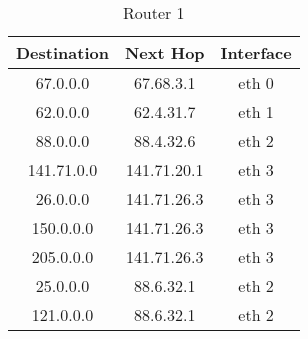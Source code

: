 \documentclass{WeSTassignment}
\begin{document}
\begin{table}[h]
\centering
\caption{Router 1}
\label{Router 1}
\begin{tabular}{ccc}
\hline
\multicolumn{1}{|c|}{\textbf{Destination}} & \multicolumn{1}{c|}{\textbf{Next Hop}} & \multicolumn{1}{c|}{\textbf{Interface}} \\ \hline
67.0.0.0                                   & 67.68.3.1                              & eth 0                                   \\
62.0.0.0                                   & 62.4.31.7                              & eth 1                                   \\
88.0.0.0                                   & 88.4.32.6                              & eth 2                                    \\
141.71.0.0                                 & 141.71.20.1                            & eth 3                                    \\
26.0.0.0                                   & 141.71.26.3                            & eth 3                                   \\
150.0.0.0                                  & 141.71.26.3                            & eth 3                                   \\
205.0.0.0                                  & 141.71.26.3                            & eth 3                                    \\
25.0.0.0                                   & 88.6.32.1                              & eth 2                                    \\
121.0.0.0                                  & 88.6.32.1                              & eth 2                                   
\end{tabular}
\end{table}
\end{document}
